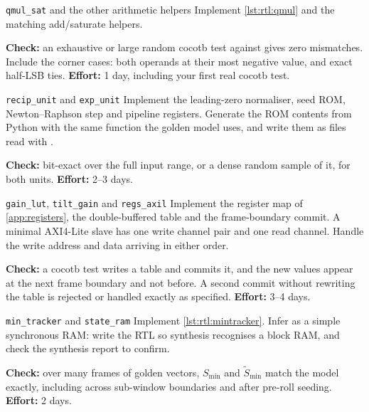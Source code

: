 \begin{stepbox}[label=st:rtl:qmul]{\texttt{qmul\_sat} and the other arithmetic helpers}
Implement \cref{lst:rtl:qmul} and the matching add/saturate helpers.

\textbf{Check:} an exhaustive or large random cocotb test against
 gives zero mismatches. Include the corner cases: both
operands at their most negative value, and exact half-LSB ties.
\textbf{Effort:} 1 day, including your first real cocotb test.
\end{stepbox}

\begin{stepbox}[label=st:rtl:recip]{\texttt{recip\_unit} and \texttt{exp\_unit}}
Implement the leading-zero normaliser, seed ROM, Newton--Raphson step and
pipeline registers. Generate the ROM contents from Python with the same function
the golden model uses, and write them as  files read with
.

\textbf{Check:} bit-exact over the full input range, or a dense random sample
of it, for both units. \textbf{Effort:} 2--3 days.
\end{stepbox}

\begin{stepbox}[label=st:rtl:lutregs]{\texttt{gain\_lut}, \texttt{tilt\_gain} and \texttt{regs\_axil}}
Implement the register map of \cref{app:registers}, the double-buffered table
and the frame-boundary commit. A minimal AXI4-Lite slave has one write channel
pair and one read channel. Handle the write address and data arriving in either
order.

\textbf{Check:} a cocotb test writes a table and commits it, and the new values
appear at the next frame boundary and not before. A second commit without
rewriting the table is rejected or handled exactly as specified.
\textbf{Effort:} 3--4 days.
\end{stepbox}

\begin{stepbox}[label=st:rtl:mintrk]{\texttt{min\_tracker} and \texttt{state\_ram}}
Implement \cref{lst:rtl:mintracker}. Infer  as a simple
synchronous RAM: write the RTL so synthesis recognises a block RAM, and check
the synthesis report to confirm.

\textbf{Check:} over many frames of golden vectors, $S_\text{min}$ and
$\tilde S_\text{min}$ match the model exactly, including across sub-window
boundaries and after pre-roll seeding. \textbf{Effort:} 2 days.
\end{stepbox}

